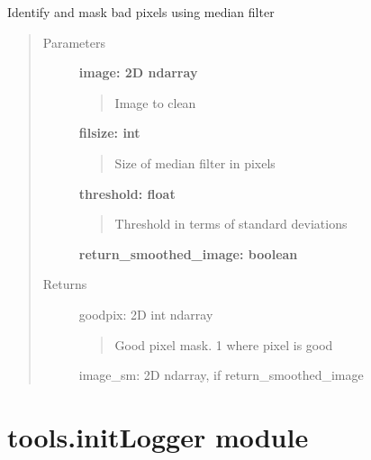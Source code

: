 \documentclass[letterpaper,10pt,english]{sphinxmanual}
\begin{document}
\begin{fulllineitems}
\label{tools:tools.imgtools.gen_bad_pix_mask}
Identify and mask bad pixels using median filter
\begin{quote}\begin{description}
\item[{Parameters}] \leavevmode
\textbf{image: 2D ndarray}
\begin{quote}

Image to clean
\end{quote}

\textbf{filsize: int}
\begin{quote}

Size of median filter in pixels
\end{quote}

\textbf{threshold: float}
\begin{quote}

Threshold in terms of standard deviations
\end{quote}

\textbf{return\_smoothed\_image: boolean}

\item[{Returns}] \leavevmode
goodpix: 2D int ndarray
\begin{quote}

Good pixel mask. 1 where pixel is good
\end{quote}

image\_sm: 2D ndarray, if return\_smoothed\_image

\end{description}\end{quote}

\end{fulllineitems}



\section{tools.initLogger module}
\label{tools:module-tools.initLogger}\label{tools:tools-initlogger-module}
\end{document}
